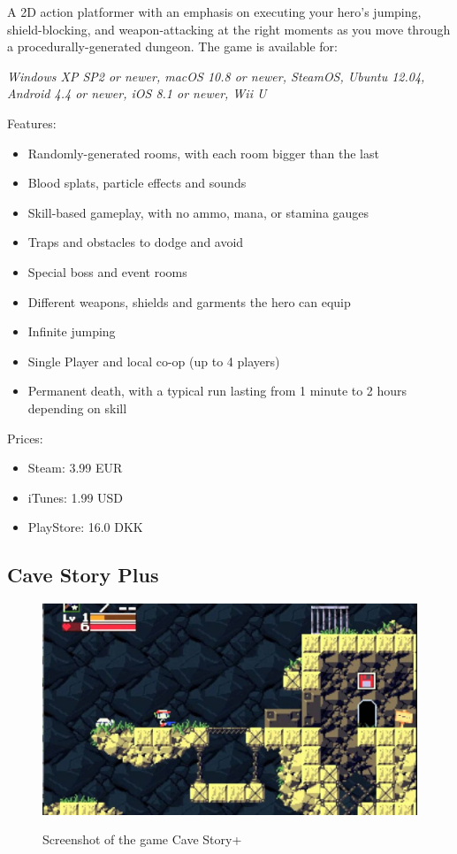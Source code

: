 \documentclass[12p]{article}
\begin{document}
A 2D action platformer with an emphasis on executing your hero's jumping, shield-blocking, and weapon-attacking at the right moments as you move through a procedurally-generated dungeon. The game is available for:

\emph{Windows XP SP2 or newer, macOS 10.8 or newer, SteamOS, Ubuntu 12.04, Android 4.4 or newer, iOS 8.1 or newer, Wii U}

Features:

\begin{itemize}
  \item Randomly-generated rooms, with each room bigger than the last
  \item Blood splats, particle effects and sounds
  \item Skill-based gameplay, with no ammo, mana, or stamina gauges
  \item Traps and obstacles to dodge and avoid
  \item Special boss and event rooms
  \item Different weapons, shields and garments the hero can equip
  \item Infinite jumping
  \item Single Player and local co-op (up to 4 players)
  \item Permanent death, with a typical run lasting from 1 minute to 2 hours depending on skill
\end{itemize}

Prices:

\begin{itemize}
  \item Steam: 3.99 EUR
  \item iTunes: 1.99 USD
  \item PlayStore: 16.0 DKK
\end{itemize}


\subsection{Cave Story Plus}

\begin{figure}[ht]
  \center
  \includegraphics[width=1\textwidth]{StateOfTheArtScreenshots/cave_story_plus}
  \label{StateOfTheArt_Screenshots_CaveStoryPlus}
  \caption{Screenshot of the game Cave Story+ \cite{CaveStoryPlusScreenshot}}
\end{figure}
\end{document}
